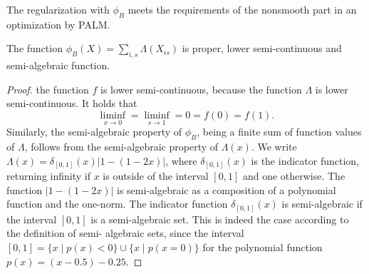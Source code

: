 The regularization with $\phi_B$ meets the requirements of the nonsmooth part in an optimization by PALM. 
\begin{lemma}
The function $\phi_B(X)=\sum_{i,s}\Lambda(X_{is})$ is proper, lower semi-continuous and semi-algebraic function.
\end{lemma}
\begin{proof}
the function $f$ is lower semi-continuous, because the function $\Lambda$ is lower semi-continuous. It holds that 
\[\liminf_{x\rightarrow 0}=\liminf_{s\rightarrow 1}=0=f(0)=f(1).\]
Similarly, the semi-algebraic property of $\phi_B$, being a finite sum of function values of $\Lambda$, follows from the semi-algebraic property of $\Lambda(x)$. We write $\Lambda(x)=\delta_{[0,1]}(x)|1-(1-2x)|$, where $\delta_{[0,1]}(x)$ is the indicator function, returning infinity if $x$ is outside of the interval $[0,1]$ and one otherwise. The function $|1-(1-2x)|$ is semi-algebraic as a composition of a polynomial function and the one-norm. The indicator function $\delta_{[0,1]}(x)$ is semi-algebraic if the interval $[0,1]$ is a semi-algebraic set. This is indeed the case according to the definition of semi- algebraic sets, since the interval $[0,1]=\{x\mid p(x)<0\}\cup\{x\mid p(x=0)\}$ for the polynomial function $p(x)=(x-0.5)-0.25$.
\end{proof}
